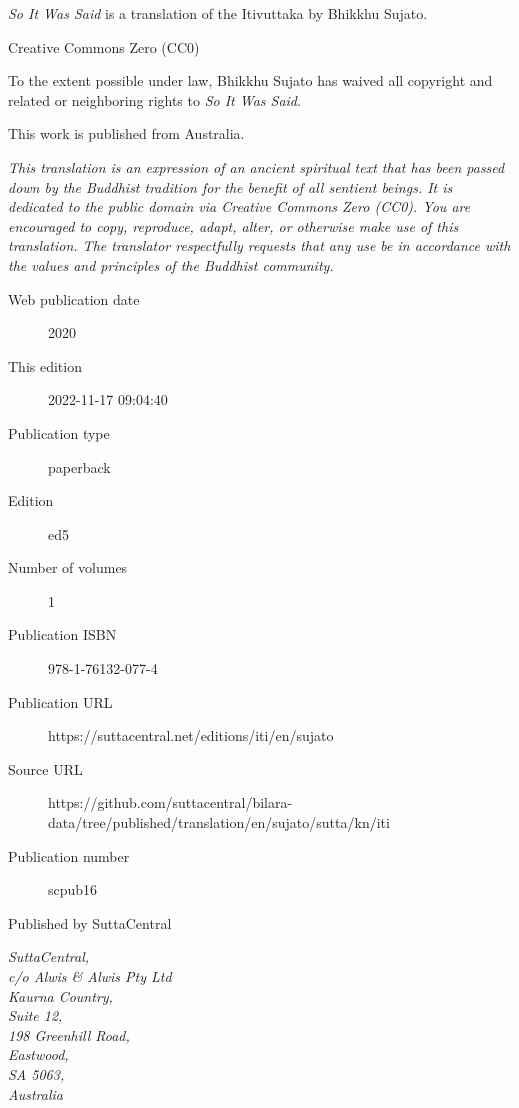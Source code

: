 \documentclass[12pt,openany]{book}%
\begin{document}
\begin{footnotesize}

\textit{So It Was Said} is a translation of the Itivuttaka by Bhikkhu Sujato.

\medskip

Creative Commons Zero (CC0)

To the extent possible under law, Bhikkhu Sujato has waived all copyright and related or neighboring rights to \textit{So It Was Said}.

\medskip

This work is published from Australia.

\begin{center}
\textit{This translation is an expression of an ancient spiritual text that has been passed down by the Buddhist tradition for the benefit of all sentient beings. It is dedicated to the public domain via Creative Commons Zero (CC0). You are encouraged to copy, reproduce, adapt, alter, or otherwise make use of this translation. The translator respectfully requests that any use be in accordance with the values and principles of the Buddhist community.}
\end{center}

\medskip

\begin{description}
    \item[Web publication date] 2020
    \item[This edition] 2022-11-17 09:04:40
    \item[Publication type] paperback
    \item[Edition] ed5
    \item[Number of volumes] 1
    \item[Publication ISBN] 978-1-76132-077-4
    \item[Publication URL] https://suttacentral.net/editions/iti/en/sujato
    \item[Source URL] https://github.com/suttacentral/bilara-data/tree/published/translation/en/sujato/sutta/kn/iti
    \item[Publication number] scpub16
\end{description}

\medskip

Published by SuttaCentral

\medskip

\textit{SuttaCentral,\\
c/o Alwis \& Alwis Pty Ltd\\
Kaurna Country,\\
Suite 12,\\
198 Greenhill Road,\\
Eastwood,\\
SA 5063,\\
Australia}

\end{footnotesize}
\end{document}
